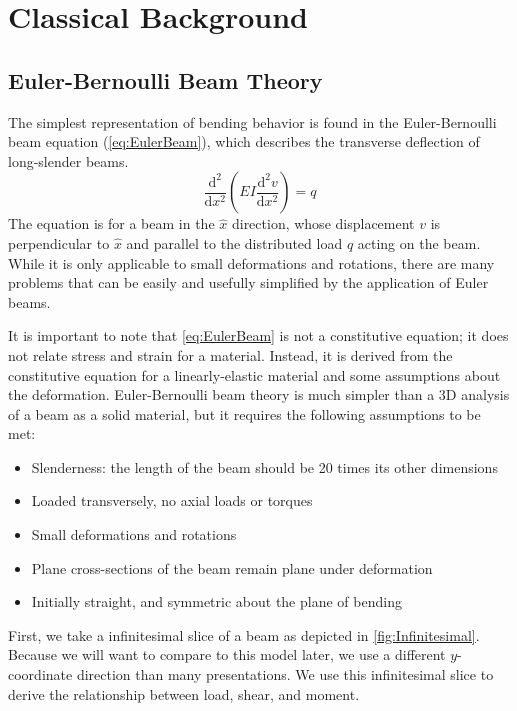 \chapter{Classical Background}

\section{Euler-Bernoulli Beam Theory}
%
The simplest representation of bending behavior is found in the Euler-Bernoulli beam equation (\cref{eq:EulerBeam}), which describes the transverse deflection of long-slender beams.
\begin{equation}
\label{eq:EulerBeam}
\frac{\text{d}^2}{\text{d}x^2}\left(EI\frac{\text{d}^2 v}{\text{d} x^2}\right) = q
\end{equation}
The equation is for a beam in the $\hat{x}$ direction, whose displacement $v$ is perpendicular to $\hat{x}$ and parallel to the distributed load $q$ acting on the beam.
While it is only applicable to small deformations and rotations, there are many problems that can be easily and usefully simplified by the application of Euler beams.

It is important to note that \cref{eq:EulerBeam} is not a constitutive equation; it does not relate stress and strain for a material. 
Instead, it is derived from the constitutive equation for a linearly-elastic material and some assumptions about the deformation.
Euler-Bernoulli beam theory is much simpler than a 3D analysis of a beam as a solid material, but it requires the following assumptions to be met:
\begin{itemize}
 \item Slenderness: the length of the beam should be 20 times its other dimensions
 \item Loaded transversely, no axial loads or torques
 \item Small deformations and rotations
 \item Plane cross-sections of the beam remain plane under deformation
 \item Initially straight, and symmetric about the plane of bending
\end{itemize}
First, we take a infinitesimal slice of a beam as depicted in \cref{fig:Infinitesimal}.
Because we will want to compare to this model later, we use a different $y$-coordinate direction than many presentations.
We use this infinitesimal slice to derive the relationship between load, shear, and moment.

